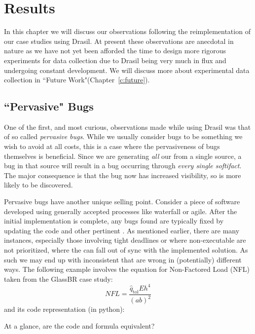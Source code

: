 \chapter{Results}
\label{c:results}

In this chapter we will discuss our observations following the reimplementation 
of our case studies using Drasil. At present these observations are 
anecdotal in nature as we have not yet been afforded the time to design more 
rigorous experiments for data collection due to Drasil being very much in flux 
and undergoing constant development. We will discuss more about experimental 
data collection in ``Future Work"(Chapter~\ref{c:future}).

\section{``Pervasive" Bugs} 

One of the first, and most curious, observations made while using Drasil
was that of so called \emph{pervasive bugs}. While we usually consider bugs to 
be something we wish to avoid at all costs, this is a case where the 
pervasiveness of bugs themselves is beneficial. Since we are generating 
\emph{all} our \sfs{} from a single source, a bug in that source will 
result in a bug occurring through \emph{every single softifact}. The major 
consequence is that the bug now has increased visibility, so is more likely to 
be discovered.


Pervasive bugs have another unique selling point. Consider a piece of software 
developed using generally accepted processes like 
waterfall or agile. After the initial implementation is complete, any 
bugs found are typically fixed by updating the code and other pertinent 
\sfs{}. As mentioned earlier, there are many instances, especially those 
involving tight deadlines or where non-executable \sfs{} are not 
prioritized, where the \sfs{} can fall out of sync with the implemented 
solution. As such we may end up with inconsistent \sfs{} that are wrong in 
(potentially) different ways. The following example involves the equation for 
Non-Factored Load (NFL) taken from the GlassBR case study:
\[\mathit{NFL}=\frac{{\hat{q}_{\text{tol}}} E h^{4}}{\left(a b\right)^{2}}\]
and its code representation (in python): 

At a glance, are the code and formula equivalent? 

